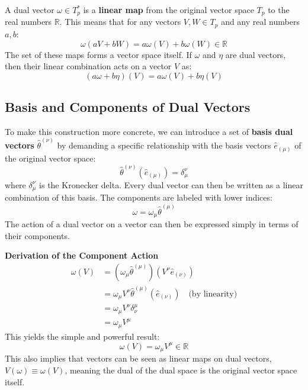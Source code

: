 \documentclass[11pt, a4paper]{report}
\begin{document}
A dual vector $\omega \in T_p^*$ is a \textbf{linear map} from the original vector space $T_p$ to the real numbers $\mathbb{R}$. This means that for any vectors $V, W \in T_p$ and any real numbers $a, b$:
\begin{equation}
    \omega(aV + bW) = a\omega(V) + b\omega(W) \in \mathbb{R}
\end{equation}
The set of these maps forms a vector space itself. If $\omega$ and $\eta$ are dual vectors, then their linear combination acts on a vector $V$ as:
\begin{equation}
    (a\omega + b\eta)(V) = a\omega(V) + b\eta(V)
\end{equation}

\subsection*{Basis and Components of Dual Vectors}

To make this construction more concrete, we can introduce a set of \textbf{basis dual vectors} $\hat{\theta}^{(\nu)}$ by demanding a specific relationship with the basis vectors $\hat{e}_{(\mu)}$ of the original vector space:
\begin{equation}
    \hat{\theta}^{(\nu)}(\hat{e}_{(\mu)}) = \delta^\nu_\mu
\end{equation}
where $\delta^\nu_\mu$ is the Kronecker delta. Every dual vector can then be written as a linear combination of this basis. The components are labeled with lower indices:
\begin{equation}
    \omega = \omega_\mu \hat{\theta}^{(\mu)}
\end{equation}
The action of a dual vector on a vector can then be expressed simply in terms of their components.

\textbf{Derivation of the Component Action}
\begin{align*}
    \omega(V) &= (\omega_\mu \hat{\theta}^{(\mu)})(V^\nu \hat{e}_{(\nu)}) \\
    &= \omega_\mu V^\nu \hat{\theta}^{(\mu)}(\hat{e}_{(\nu)}) \quad \text{(by linearity)} \\
    &= \omega_\mu V^\nu \delta^\mu_\nu \\
    &= \omega_\mu V^\mu
\end{align*}
This yields the simple and powerful result:
\begin{equation}
    \omega(V) = \omega_\mu V^\mu \in \mathbb{R}
\end{equation}
This also implies that vectors can be seen as linear maps on dual vectors, $V(\omega) \equiv \omega(V)$, meaning the dual of the dual space is the original vector space itself.
\end{document}
